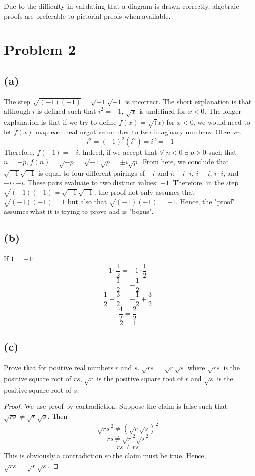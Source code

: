 \documentclass{article}
\begin{document}
Due to the difficulty in validating that a diagram is drawn correctly, algebraic proofs are preferable to pictorial proofs when available.

\pagebreak
\section{Problem 2}
\subsection{(a)}
The step $\sqrt{(-1)(-1)} = \sqrt{-1}\sqrt{-1}$ is incorrect. The short explanation is that although $i$ is defined such that $i^2 = -1$, $\sqrt{x}$ is undefined for $x < 0$. The longer explanation is that if we try to define $f(x) = \sqrt(x)$ for $x < 0$, we would need to let $f(x)$ map each real negative number to two imaginary numbers. Observe:
\[-i^2 = (-1)^2(i^2) = i^2 = -1\]
Therefore, $f(-1) = \pm i$. Indeed, if we accept that $\forall \; n < 0 \; \exists \; p > 0$ such that $n = -p$, $f(n) = \sqrt{-p} = \sqrt{-1}\sqrt{p} = \pm i \sqrt{p}$. From here, we conclude that $\sqrt{-1}\sqrt{-1}$ is equal to four different pairings of $-i$ and $i$: $-i \cdot i$, $i \cdot -i$, $i \cdot i$, and $-i \cdot -i$. These pairs evaluate to two distinct values: $\pm 1$. Therefore, in the step $\sqrt{(-1)(-1)} = \sqrt{-1}\sqrt{-1}$, the proof not only assumes that $\sqrt{(-1)(-1)} = 1$ but also that $\sqrt{(-1)(-1)} = -1$. Hence, the "proof" assumes what it is trying to prove and is "bogus".
\subsection{(b)}
If $1 = -1$:
\[1 \cdot \frac{1}{2} = -1 \cdot \frac{1}{2}\]
\[\frac{1}{2} = - \frac{1}{2}\]
\[\frac{1}{2} + \frac{3}{2} = - \frac{1}{2} + \frac{3}{2}\]
\[\frac{4}{2} = \frac{2}{2}\]
\[2 = 1\]
\subsection{(c)}
Prove that for positive real numbers $r$ and $s$, $\sqrt{rs} = \sqrt{r}\sqrt{s}$ where $\sqrt{rs}$ is the positive square root of $rs$, $\sqrt{r}$ is the positive square root of $r$ and $\sqrt{s}$ is the positive square root of $s$.
\begin{proof}
	We use proof by contradiction. Suppose the claim is false such that $\sqrt{rs} \neq \sqrt{r}\sqrt{s}$. Then
	\[
		\sqrt{rs}^2 \neq (\sqrt{r}\sqrt{s})^2
	\]
	\[
		rs \neq \sqrt{r}^2 \sqrt{s}^2
	\]
	\[
		rs \neq rs
	\]
	This is obviously a contradiction so the claim must be true. Hence, $\sqrt{rs} = \sqrt{r}\sqrt{s}$.
\end{proof}
\pagebreak
\end{document}
